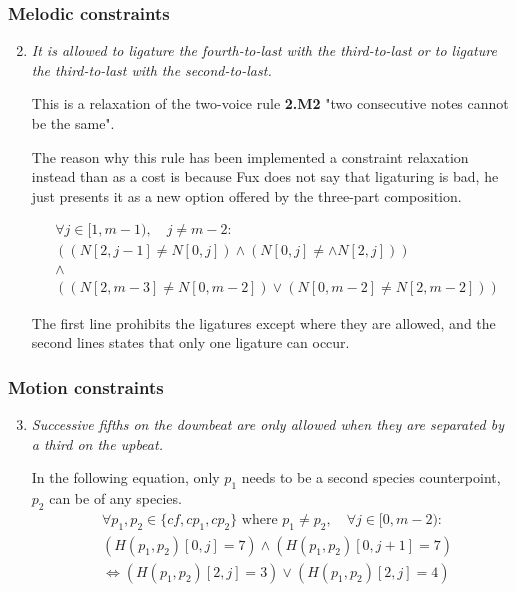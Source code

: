 \subsubsection{Melodic constraints}
\begin{enumerate}[wide, label=\bfseries 2.M\arabic*]
\setcounter{enumi}{1} %
    \item \textit{It is allowed to ligature the fourth-to-last with the third-to-last or to ligature the third-to-last with the second-to-last.} \label{constraint:2nd-species-ligatures}  

    This is a relaxation of the two-voice rule \textbf{2.M2} "two consecutive notes cannot be the same".
    
    The reason why this rule has been implemented a constraint relaxation instead than as a cost is because Fux does not say that ligaturing is bad, he just presents it as a new option offered by the three-part composition.

    \begin{equation}
        \begin{aligned}
            &\forall j \in [1, m-1), \quad j \neq m-2:\\
            &((N[2, j-1] \neq N[0, j]) \land (N[0, j] \neq \land N[2, j])) \\
            &\land \\
            & ((N[2, m-3] \neq N[0, m-2]) \lor (N[0, m-2] \neq N[2, m-2]) )
        \end{aligned}
    \end{equation}

    The first line prohibits the ligatures except where they are allowed, and the second lines states that only one ligature can occur.
\end{enumerate}

\subsubsection{Motion constraints}
\begin{enumerate}[wide, label=\bfseries 2.P\arabic*]
\setcounter{enumi}{2} 
    \item \textit{Successive fifths on the downbeat are only allowed when they are separated by a third on the upbeat.} \label{constraint:succ-fifths-flanking-third}    
    
    In the following equation, only $p_1$ needs to be a second species counterpoint, $p_2$ can be of any species.
    \begin{equation}
        \begin{aligned}
            & \forall p_1, p_2 \in \{cf, cp_1, cp_2\} \text{ where }  p_1 \neq p_2, \quad \forall j \in [0, m-2): \\
            & (H(p_1, p_2)[0, j] = 7) \land (H(p_1, p_2)[0, j+1] = 7) \\
            & \iff (H(p_1, p_2)[2, j] = 3) \lor (H(p_1, p_2)[2, j] = 4)
        \end{aligned}
    \end{equation}
\end{enumerate}

